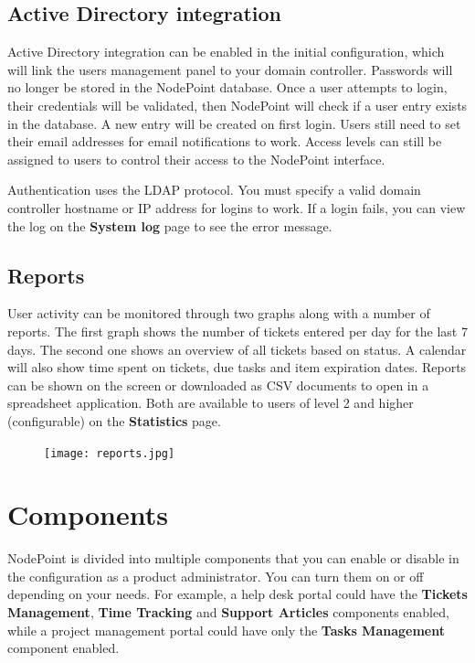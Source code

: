 \documentclass[11pt]{article}
\begin{document}
\subsection{Active Directory integration}
Active Directory integration can be enabled in the initial configuration, which will link the users management panel to your domain controller. Passwords will no longer be stored in the NodePoint database. Once a user attempts to login, their credentials will be validated, then NodePoint will check if a user entry exists in the database. A new entry will be created on first login. Users still need to set their email addresses for email notifications to work. Access levels can still be assigned to users to control their access to the NodePoint interface.

Authentication uses the LDAP protocol. You must specify a valid domain controller hostname or IP address for logins to work. If a login fails, you can view the log on the \textbf{System log} page to see the error message.

\subsection{Reports}
User activity can be monitored through two graphs along with a number of reports. The first graph shows the number of tickets entered per day for the last 7 days. The second one shows an overview of all tickets based on status. A calendar will also show time spent on tickets, due tasks and item expiration dates. Reports can be shown on the screen or downloaded as CSV documents to open in a spreadsheet application. Both are available to users of level 2 and higher (configurable) on the \textbf{Statistics} page.

\begin{figure}[h]
\texttt{[image: reports.jpg]}
\end{figure}

\clearpage
\section{Components}
NodePoint is divided into multiple components that you can enable or disable in the configuration as a product administrator. You can turn them on or off depending on your needs. For example, a help desk portal could have the \textbf{Tickets Management}, \textbf{Time Tracking} and \textbf{Support Articles} components enabled, while a project management portal could have only the \textbf{Tasks Management} component enabled.
\end{document}
